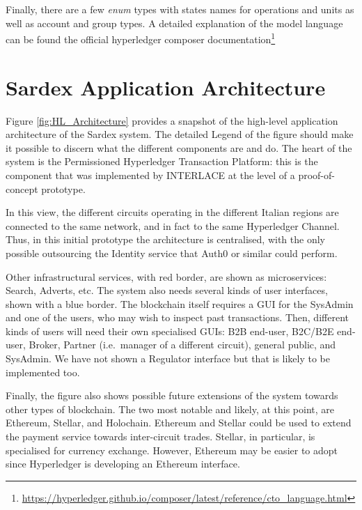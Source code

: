 Finally, there are a few \textit{enum} types with states names for operations and units as well as account and group types. A detailed explanation of the model language can be found the official hyperledger composer documentation\footnote{\url{https://hyperledger.github.io/composer/latest/reference/cto_language.html}}

\section{Sardex Application Architecture}
Figure \ref{fig:HL_Architecture} provides a snapshot of the high-level application architecture of the Sardex system. The detailed Legend of the figure should make it possible to discern what the different components are and do. The heart of the system is the Permissioned Hyperledger Transaction Platform: this is the component that was implemented by INTERLACE at the level of a proof-of-concept prototype.

In this view, the different circuits operating in the different Italian regions are connected to the same network, and in fact to the same Hyperledger Channel. Thus, in this initial prototype the architecture is centralised, with the only possible outsourcing the Identity service that Auth0 or similar could perform.

Other infrastructural services, with red border, are shown as microservices: Search, Adverts, etc. The system also needs several kinds of user interfaces, shown with a blue border. The blockchain itself requires a GUI for the SysAdmin and one of the users, who may wish to inspect past transactions. Then, different kinds of users will need their own specialised GUIs: B2B end-user, B2C/B2E end-user, Broker, Partner (i.e.\ manager of a different circuit), general public, and SysAdmin. We have not shown a Regulator interface but that is likely to be implemented too.

Finally, the figure also shows possible future extensions of the system towards other types of blockchain. The two most notable and likely, at this point, are Ethereum, Stellar, and Holochain. Ethereum and Stellar could be used to extend the payment service towards inter-circuit trades. Stellar, in particular, is specialised for currency exchange. However, Ethereum may be easier to adopt since Hyperledger is developing an Ethereum interface.

